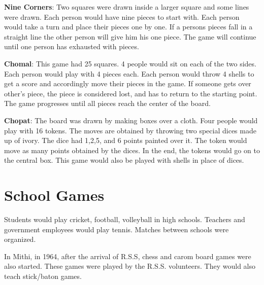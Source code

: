 \textbf{Nine Corners}: Two squares were drawn inside a larger square and some
lines were drawn. Each person would have nine pieces to start with.  Each
person would take a turn and place their pieces one by one. If a persons pieces
fall in a straight line the other person will give him his one piece. The game
will continue until one person has exhausted with pieces.

\textbf{Chomal}: This game had 25 squares. 4 people would sit on each of the
two sides. Each person would play with 4 pieces each. Each person would throw 4
shells to get a score and accordingly move their pieces in the game. If someone
gets over other's piece, the piece is considered lost, and has to return to the
starting point. The game progresses until all pieces reach the center of the
board.

\textbf{Chopat}: The board was drawn by making boxes over a cloth. Four people
would play with 16 tokens. The moves are obtained by throwing two special dices
made up of ivory. The dice had 1,2,5, and 6 points painted over it. The token
would move as many points obtained by the dices. In the end, the tokens would
go on to the central box. This game would also be played with shells in place
of dices.

\section{School Games}

Students would play cricket, football, volleyball in high schools. Teachers
and government employees would play tennis. Matches between schools were
organized.

In Mithi, in 1964, after the arrival of R.S.S, chess and carom board games were
also started. These games were played by the R.S.S. volunteers. They would also
teach stick/baton games.

